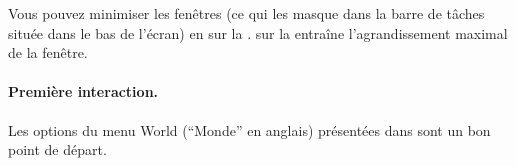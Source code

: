 \documentclass[a4paper,10pt,twoside]{book}
\begin{document}
Vous pouvez minimiser les fenêtres (ce qui les masque dans la
barre de tâches située dans le bas de l'écran) en \clickant{} sur la
. \Click{} sur la 
entraîne l'agrandissement maximal de la fenêtre.

\paragraph{Première interaction.}

Les options du menu World (``Monde'' en anglais) présentées dans
 sont un bon point de départ.

\end{document}
